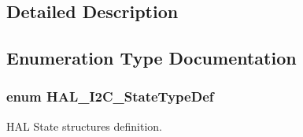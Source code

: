 \subsection{Detailed Description}


\subsection{Enumeration Type Documentation}
\subsubsection[{\texorpdfstring{H\+A\+L\+\_\+\+I2\+C\+\_\+\+State\+Type\+Def}{HAL_I2C_StateTypeDef}}]{\setlength{\rightskip}{0pt plus 5cm}enum {\bf H\+A\+L\+\_\+\+I2\+C\+\_\+\+State\+Type\+Def}}\hypertarget{group___i2_c___exported___types_gaef355af8eab251ae2a19ee164ad81c37}{}\label{group___i2_c___exported___types_gaef355af8eab251ae2a19ee164ad81c37}


H\+AL State structures definition. 

